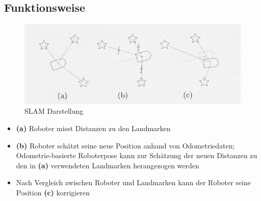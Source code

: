 \subsection{Funktionsweise}
\begin{figure}[H]
	\begin{center}
		\includegraphics[scale=0.5]{Resources/PNG/FunktionsweiseSLAM.png}
		\caption{SLAM Darstellung}
		\label{fig:PNG/FunktionsweiseSLAM.png}
	\end{center}
\end{figure}
\begin{itemize}
	\item \textbf{(a)} Roboter misst Distanzen zu den Landmarken
	\item \textbf{(b)} Roboter schätzt seine neue Position anhand von Odometriedaten; Odometrie-basierte Roboterpose kann zur Schätzung der neuen Distanzen zu den in \textbf{(a)} verwendeten Landmarken herangezogen werden
	\item Nach Vergleich zwischen Roboter und Landmarken kann der Roboter seine Position \textbf{(c)} korrigieren
\end{itemize}
